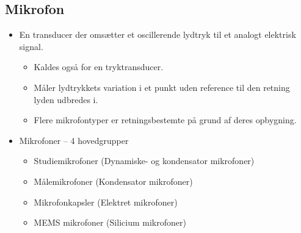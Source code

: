 \subsection{Mikrofon}
\begin{itemize}
	\item En transducer der omsætter et oscillerende lydtryk til et analogt elektrisk signal.
	\begin{itemize}
		\item Kaldes også for en tryktransducer.
		\item Måler lydtrykkets variation i et punkt uden reference til den retning lyden udbredes i.
		\item Flere mikrofontyper er retningsbestemte på grund af deres opbygning.
	\end{itemize}
	\newpage\item Mikrofoner – 4 hovedgrupper
	\begin{itemize}
		\item Studiemikrofoner (Dynamiske- og kondensator mikrofoner)
		\item Målemikrofoner (Kondensator mikrofoner)
		\item Mikrofonkapsler (Elektret mikrofoner)
		\item MEMS mikrofoner (Silicium mikrofoner)
	\end{itemize}
\end{itemize}

